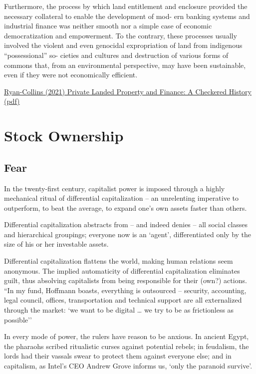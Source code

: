 \documentclass[
]{book}
\begin{document}
Furthermore, the process by which land entitlement and enclosure
provided the necessary collateral to enable the development of mod-
ern banking systems and industrial finance was neither smooth nor
a simple case of economic democratization and empowerment. To
the contrary, these processes usually involved the violent and even
genocidal expropriation of land from indigenous ``possessional'' so-
cieties and cultures and destruction of various forms of commons
that, from an environmental perspective, may have been sustainable,
even if they were not economically efficient.

\href{https://onlinelibrary.wi\%20ley.com/doi/10.1111/ajes.12387}{Ryan-Collins (2021) Private Landed Property and Finance: A Checkered History}
\href{pdf/Ryan-Collins_2021_Private_Landed_Property_and_Finance.pdf}{(pdf)}

\hypertarget{stock-ownership}{%
\chapter{Stock Ownership}\label{stock-ownership}}

\hypertarget{fear}{%
\section{Fear}\label{fear}}

In the twenty-first century, capitalist power is imposed through a highly mechanical ritual of
differential capitalization -- an unrelenting imperative to outperform, to beat the average, to
expand one's own assets faster than others.

Differential capitalization
abstracts from -- and indeed denies -- all social classes and hierarchical groupings; everyone
now is an `agent', differentiated only by the size of his or her investable assets.

Differential capitalization flattens the world,
making human relations seem anonymous.
The implied
automaticity of differential capitalization eliminates guilt, thus absolving capitalists from being
responsible for their (own?) actions.
``In my fund, Hoffmann boasts, everything is outsourced -- security, accounting, legal
council, offices, transportation and technical support are all externalized through the market:
`we want to be digital \ldots{} we try to be as frictionless as possible''

In every mode of power, the rulers have reason to be anxious. In ancient Egypt, the pharaohs
scribed ritualistic curses against potential rebels; in feudalism, the lords had their vassals
swear to protect them against everyone else; and in capitalism, as Intel's CEO Andrew Grove
informs us, `only the paranoid survive'.
\end{document}
